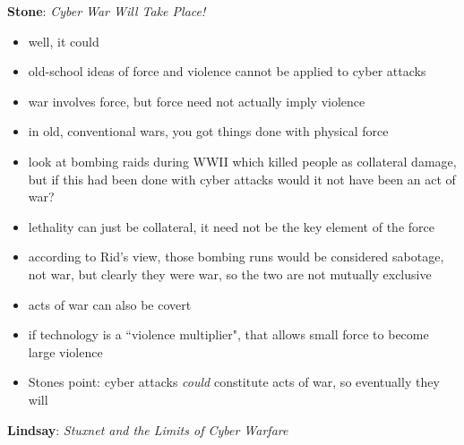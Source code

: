 \documentclass{article}
\begin{document}
\medskip
\textbf{Stone}: \textit{Cyber War Will Take Place!}
\begin{itemize}
    \item well, it could
    \item old-school ideas of force and violence cannot be applied to cyber attacks
    \item war involves force, but force need not actually imply violence
    \item in old, conventional wars, you got things done with physical force
    \item look at bombing raids during WWII which killed people as collateral damage, but if this had been done with cyber attacks would it not have been an act of war?
    \item lethality can just be collateral, it need not be the key element of the force
    \item according to Rid's view, those bombing runs would be considered sabotage, not war, but clearly they were war, so the two are not mutually exclusive
    \item acts of war can also be covert
    \item if technology is a ``violence multiplier", that allows small force to become large violence
    \item Stones point: cyber attacks \textit{could} constitute acts of war, so eventually they will
\end{itemize}
\medskip
\textbf{Lindsay}: \textit{Stuxnet and the Limits of Cyber Warfare}
\end{document}
